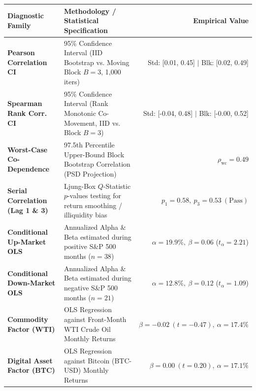 \documentclass[10pt,a4paper]{article}
\begin{document}
\vspace{0.45em}

\begin{tcolorbox}[colback=white, colframe=primary, title=\textbf{\small\strut Appendix A: Extended Statistical, Bootstrap \& Factor Diagnostics}, fonttitle=\sffamily\bfseries\small, arc=5pt, boxrule=0.8pt, toptitle=4pt, bottomtitle=4pt, left=6pt, right=6pt, top=3.5pt, bottom=3.5pt, colbacktitle=primary]
\renewcommand{\arraystretch}{1.22}
\scriptsize
\begin{tabularx}{\textwidth}{l X r}
\toprule
\textbf{\textcolor{primary}{Diagnostic Family}} & \textbf{\textcolor{primary}{Methodology / Statistical Specification}} & \textbf{\textcolor{primary}{Empirical Value}} \\
\midrule
\textbf{Pearson Correlation CI} & 95\% Confidence Interval (IID Bootstrap vs. Moving Block $B=3$, 1,000 iters) & Std: [0.01, 0.45] $\vert$ Blk: [0.02, 0.49] \\
\rowcolor{cardbg} \textbf{Spearman Rank Corr. CI} & 95\% Confidence Interval (Rank Monotonic Co-Movement, IID vs. Block $B=3$) & Std: [-0.04, 0.48] $\vert$ Blk: [-0.00, 0.52] \\
\textbf{Worst-Case Co-Dependence} & 97.5th Percentile Upper-Bound Block Bootstrap Correlation (PSD Projection) & $\rho_{\text{wc}} = 0.49$ \\
\rowcolor{cardbg} \textbf{Serial Correlation (Lag 1 \& 3)} & Ljung-Box $Q$-Statistic $p$-values testing for return smoothing / illiquidity bias & $p_1=0.58,\ p_3=0.53\ (\text{Pass})$ \\
\textbf{Conditional Up-Market OLS} & Annualized Alpha \& Beta estimated during positive S\&P 500 months ($n=38$) & $\alpha=19.9\%,\ \beta=0.06$ ($t_\alpha=2.21$) \\
\rowcolor{cardbg} \textbf{Conditional Down-Market OLS} & Annualized Alpha \& Beta estimated during negative S\&P 500 months ($n=21$) & $\alpha=12.8\%,\ \beta=0.12$ ($t_\alpha=1.09$) \\
\textbf{Commodity Factor (WTI)} & OLS Regression against Front-Month WTI Crude Oil Monthly Returns & $\beta=-0.02\ (t=-0.47),\ \alpha=17.4\%$ \\
\rowcolor{cardbg} \textbf{Digital Asset Factor (BTC)} & OLS Regression against Bitcoin (BTC-USD) Monthly Returns & $\beta=0.00\ (t=0.20),\ \alpha=17.1\%$ \\
\bottomrule
\end{tabularx}
\end{tcolorbox}
\end{document}
